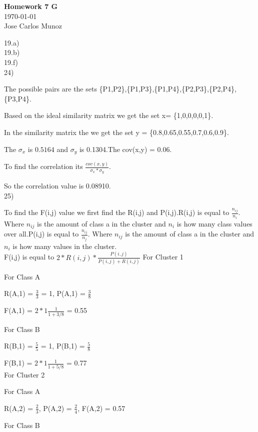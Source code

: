\documentclass[12pt,english]{article}
\begin{document}
\begin{center}
    \Large
    \textbf{Homework 7 G}\\
    \small
    \today\\
    \large
    Jose Carlos Munoz
\end{center}%
19.a)\\

19.b)\\
19.f)\\
24)\par
The possible pairs are the sets \{P1,P2\},\{P1,P3\},\{P1,P4\},\{P2,P3\},\{P2,P4\},\{P3,P4\}.\par
Based on the ideal similarity matrix we get the set x= \{1,0,0,0,0,1\}.\par
In the  similarity matrix the we get the set y = \{0.8,0.65,0.55,0.7,0.6,0.9\}.\par
The $\sigma_x$ is $0.5164$ and $\sigma_y$ is 0.1304.The cov(x,y) = 0.06. \par
To find the correlation its $\frac{cov(x,y)}{\sigma_x * \sigma_y}$.\par
So the correlation value is 0.08910.\\
25)\par
To find the F(i,j) value we first find the R(i,j) and P(i,j).R(i,j) is equal to $\frac{n_{ij}}{n_i}$. Where $n_{ij}$ is the amount of class a in the cluster and $n_i$ is how many class values over all.P(i,j) is equal to $\frac{n_{ij}}{n_j}$. Where $n_{ij}$ is the amount of class a in the cluster and $n_i$ is how many values in the cluster.\\
F(i,j) is equal to $2 * R(i,j) * \frac{P(i,j)}{P(i,j) + R(i,j)}$
For Cluster 1\par
For Class A\par
R(A,1) = $\frac{3}{3}$ = 1, P(A,1) = $\frac{3}{8}$\par
F(A,1) = $2 * 1 \frac{1}{1 + 3/8}$ = 0.55\par
For Class B\par
R(B,1) = $\frac{5}{5}$ = 1, P(B,1) = $\frac{5}{8}$\par
F(B,1) = $2 * 1 \frac{1}{1 + 5/8}$ = 0.77\\
For Cluster 2\par
For Class A\par
R(A,2) = $\frac{2}{3}$, P(A,2) = $\frac{2}{4}$, F(A,2) = 0.57\par
For Class B\par                            
\end{document}
